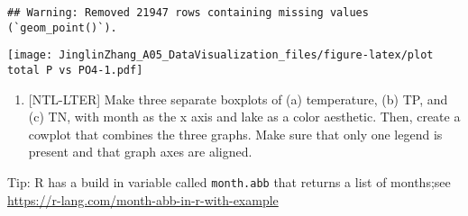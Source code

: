 \documentclass[
]{article}
\providecommand{\tightlist}{%
  \setlength{\itemsep}{0pt}\setlength{\parskip}{0pt}}
\begin{document}
\begin{verbatim}
## Warning: Removed 21947 rows containing missing values (`geom_point()`).
\end{verbatim}

\texttt{[image: JinglinZhang\_A05\_DataVisualization\_files/figure-latex/plot total P vs PO4-1.pdf]}

\begin{enumerate}
\def\labelenumi{\arabic{enumi}.}
\setcounter{enumi}{4}
\tightlist
\item
  {[}NTL-LTER{]} Make three separate boxplots of (a) temperature, (b)
  TP, and (c) TN, with month as the x axis and lake as a color
  aesthetic. Then, create a cowplot that combines the three graphs. Make
  sure that only one legend is present and that graph axes are aligned.
\end{enumerate}

Tip: R has a build in variable called \texttt{month.abb} that returns a
list of months;see \url{https://r-lang.com/month-abb-in-r-with-example}
\end{document}
